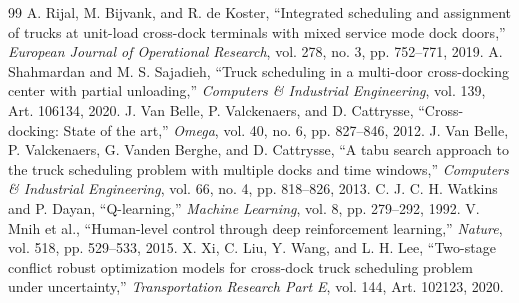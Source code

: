 \documentclass[10pt,a4paper]{article}
\begin{document}
\begin{thebibliography}{99}
 A. Rijal, M. Bijvank, and R. de Koster, ``Integrated scheduling and assignment of trucks at unit-load cross-dock terminals with mixed service mode dock doors,'' \emph{European Journal of Operational Research}, vol. 278, no. 3, pp. 752--771, 2019.
 A. Shahmardan and M. S. Sajadieh, ``Truck scheduling in a multi-door cross-docking center with partial unloading,'' \emph{Computers \& Industrial Engineering}, vol. 139, Art. 106134, 2020.
 J. Van Belle, P. Valckenaers, and D. Cattrysse, ``Cross-docking: State of the art,'' \emph{Omega}, vol. 40, no. 6, pp. 827--846, 2012.
 J. Van Belle, P. Valckenaers, G. Vanden Berghe, and D. Cattrysse, ``A tabu search approach to the truck scheduling problem with multiple docks and time windows,'' \emph{Computers \& Industrial Engineering}, vol. 66, no. 4, pp. 818--826, 2013.
 C. J. C. H. Watkins and P. Dayan, ``Q-learning,'' \emph{Machine Learning}, vol. 8, pp. 279--292, 1992.
 V. Mnih et al., ``Human-level control through deep reinforcement learning,'' \emph{Nature}, vol. 518, pp. 529--533, 2015.
 X. Xi, C. Liu, Y. Wang, and L. H. Lee, ``Two-stage conflict robust optimization models for cross-dock truck scheduling problem under uncertainty,'' \emph{Transportation Research Part E}, vol. 144, Art. 102123, 2020.
\end{thebibliography}
\end{document}
